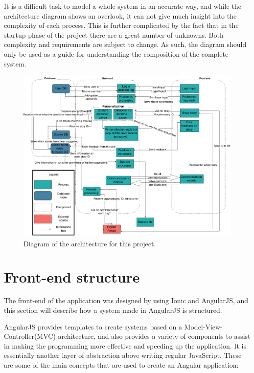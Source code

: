 It is a difficult task to model a whole system in an accurate way, and while the architecture diagram shows an overlook, it can not give much insight into the complexity of each process. This is further complicated by the fact that in the startup phase of the project there are a great number of unknowns. Both complexity and requirements are subject to change. As such, the diagram should only be used as a guide for understanding the composition of the complete system.

\begin{figure}[h!]
	\begin{center}
		\advance\leftskip-3cm
		\advance\rightskip-3cm
		\includegraphics[keepaspectratio=true,scale=0.4]{fig/architecture}
		\caption{Diagram of the architecture for this project.}
		\label{Fig:architecture}
	\end{center}
	\end{figure}

\section{Front-end structure}
\label{sec:frontend_structure}
The front-end of the application was designed by using Ionic and AngularJS, and this section will describe how a system made in AngularJS is structured.

AngularJS provides templates to create systems based on a Model-View-Controller(MVC) architecture, and also provides a variety of components to assist in making the programming more effective and speeding up the application. It is essentially another layer of abstraction above writing regular JavaScript. These are some of the main concepts that are used to create an Angular application:

